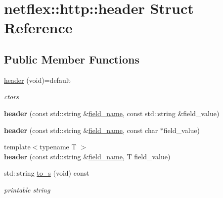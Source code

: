 \hypertarget{structnetflex_1_1http_1_1header}{}\section{netflex\+:\+:http\+:\+:header Struct Reference}
\label{structnetflex_1_1http_1_1header}
\subsection*{Public Member Functions}
\begin{DoxyCompactItemize}
\item 
\mbox{\label{structnetflex_1_1http_1_1header_a7f3b5bc1ece0799aec49784a4be083b3}} 
\hyperlink{structnetflex_1_1http_1_1header_a7f3b5bc1ece0799aec49784a4be083b3}{header} (void)=default
\begin{DoxyCompactList}\small\item\em ctors \end{DoxyCompactList}\item 
\mbox{\label{structnetflex_1_1http_1_1header_a85972735c6bd2e9ae331aa939c5631a6}} 
{\bfseries header} (const std\+::string \&\hyperlink{structnetflex_1_1http_1_1header_ae72e56634fc6e2ec9ce4ff1bd633eaff}{field\+\_\+name}, const std\+::string \&field\+\_\+value)
\item 
\mbox{\label{structnetflex_1_1http_1_1header_a5db781aa4a73145ec8054c8d7521be27}} 
{\bfseries header} (const std\+::string \&\hyperlink{structnetflex_1_1http_1_1header_ae72e56634fc6e2ec9ce4ff1bd633eaff}{field\+\_\+name}, const char $\ast$field\+\_\+value)
\item 
\mbox{\label{structnetflex_1_1http_1_1header_af5e35e57c8210a0927908f8e96598083}} 
{\footnotesize template$<$typename T $>$ }\\{\bfseries header} (const std\+::string \&\hyperlink{structnetflex_1_1http_1_1header_ae72e56634fc6e2ec9ce4ff1bd633eaff}{field\+\_\+name}, T field\+\_\+value)
\item 
\mbox{\label{structnetflex_1_1http_1_1header_a6d9c1feb8881d1488b9b5793afc00579}} 
std\+::string \hyperlink{structnetflex_1_1http_1_1header_a6d9c1feb8881d1488b9b5793afc00579}{to\+\_\+s} (void) const
\begin{DoxyCompactList}\small\item\em printable string \end{DoxyCompactList}\end{DoxyCompactItemize}
